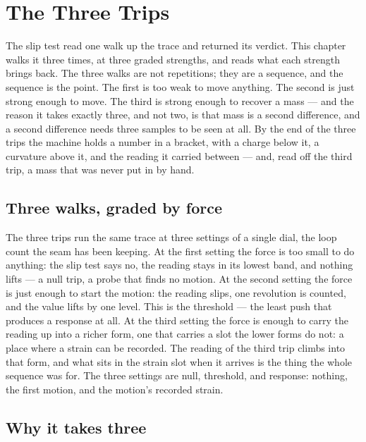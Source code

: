\chapter{The Three Trips}
\label{chap:the-three-trips}

The slip test read one walk up the trace and returned its verdict. This chapter walks it three times, at
three graded strengths, and reads what each strength brings back. The three walks are not repetitions; they
are a sequence, and the sequence is the point. The first is too weak to move anything. The second is just
strong enough to move. The third is strong enough to recover a mass --- and the reason it takes exactly
three, and not two, is that mass is a second difference, and a second difference needs three samples to be
seen at all. By the end of the three trips the machine holds a number in a bracket, with a charge below it,
a curvature above it, and the reading it carried between --- and, read off the third trip, a mass that was
never put in by hand.

\section{Three walks, graded by force}
\label{se:three-walks-graded}

The three trips run the same trace at three settings of a single dial, the loop count the seam has been
keeping. At the first setting the force is too small to do anything: the slip test says no, the reading
stays in its lowest band, and nothing lifts --- a null trip, a probe that finds no motion. At the second
setting the force is just enough to start the motion: the reading slips, one revolution is counted, and the
value lifts by one level. This is the threshold --- the least push that produces a response at all. At the
third setting the force is enough to carry the reading up into a richer form, one that carries a slot the
lower forms do not: a place where a strain can be recorded. The reading of the third trip climbs into that
form, and what sits in the strain slot when it arrives is the thing the whole sequence was for. The three
settings are null, threshold, and response: nothing, the first motion, and the motion's recorded strain.

\section{Why it takes three}
\label{se:why-three}

